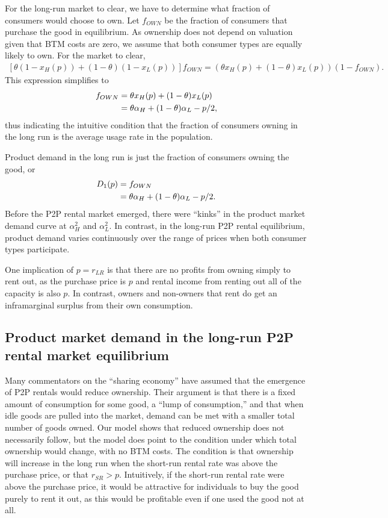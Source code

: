 \documentclass[12pt]{article}
\begin{document}
For the long-run market to clear, we have to determine what fraction of consumers would choose to own. 
Let $f_{OWN}$ be the fraction of consumers that purchase the good in equilibrium. 
As ownership does not depend on valuation given that BTM costs are zero, we assume that both consumer types are equally likely to own. 
For the market to clear, 
\begin{align}
\left[ \theta (1-x_H(p)) + (1-\theta)(1-x_L(p))\right]f_{OWN} = \left(\theta x_H(p) + (1-\theta)x_L(p) \right)(1- f_{OWN}). 
\end{align} 
This expression simplifies to 
\begin{align}
  f_{OWN} &= \theta x_H(p) + (1-\theta)x_L(p) \notag \\
         &= \theta \alpha_H + (1 - \theta) \alpha_L- p/2,
\end{align} 
thus indicating the intuitive condition that the fraction of consumers owning in the long run is the average usage rate in the population.  

Product demand in the long run is just the fraction of consumers owning the good, or 
\begin{align}
D_1(p) &= f_{OWN} \notag \\  
     &= \theta \alpha_H + (1-\theta) \alpha_L - p/2.  
\end{align} 
Before the P2P rental market emerged, there were ``kinks'' in the product market demand curve at $\alpha_H^2$ and $\alpha_L^2$. 
In contrast, in the long-run P2P rental equilibrium, product demand varies continuously over the range of prices when both consumer types participate.

One implication of $p = r_{LR}$ is that there are no profits from owning simply to rent out, as the purchase price is $p$ and rental income from renting out all of the capacity is also $p$.
In contrast, owners and non-owners that rent do get an inframarginal surplus from their own consumption. 

\subsection{Product market demand in the long-run P2P rental market equilibrium} 
Many commentators on the ``sharing economy'' have assumed that the emergence of P2P rentals would reduce ownership. 
Their argument is that there is a fixed amount of consumption for some good, a ``lump of consumption,'' and that when idle goods are pulled into the market, demand can be met with a smaller total number of goods owned.
Our model shows that reduced ownership does not necessarily follow, but the model does point to the condition under which total ownership would change, with no BTM costs.
The condition is that ownership will increase in the long run when the short-run rental rate was above the purchase price, or that $r_{SR} > p$. 
Intuitively, if the short-run rental rate were above the purchase price, it would be attractive for individuals to buy the good purely to rent it out, as this would be profitable even if one used the good not at all.
\end{document}
